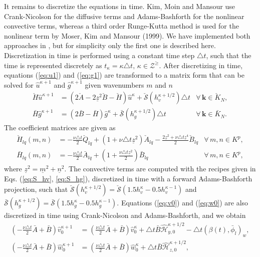 \documentclass[preprint]{elsarticle}
\newcommand{\N}[1]{\check{#1}}
\newcommand{\D}[1]{\bar{#1}}
\begin{document}
It remains to discretize the equations in time. Kim, Moin and Mansour use 
Crank-Nicolson for the diffusive terms and Adams-Bashforth for the nonlinear 
convective terms, whereas a third order Runge-Kutta method is used for the 
nonlinear term by Moser, Kim and Mansour (1999). We have implemented both 
approaches in \cite{spectralDNS}, but for simplicity only the first one is described here. 
Discretization in time is performed using a constant time step $\triangle t$, 
such that the time is represented discretely as $t_{\kappa} = {\kappa} \triangle t, \, {\kappa} \in 
\mathcal{Z}^{\ge}$. After 
discretizing in time, equations (\ref{eq:u1}) and (\ref{eq:g1}) are transformed 
to a matrix form that can be solved for $\hat{u}^{{\kappa}+1}$ and $\hat{g}^{{\kappa}+1}$ 
given wavenumbers $m$ and $n$
\begin{align}
\N{H}\hat{u}^{{\kappa}+1} & = \left(2\N{A} - 2\underline{z}^2\N{B} - \N{H} 
\right)\hat{u}^{{\kappa}} + \N{\mathcal{S}}(h_v^{{\kappa}+1/2}) \triangle t & 
\forall \, {\bm{k}} \in \N{K}_N, 
\label{eq:ufin}\\ 
\D{H} \hat{g}^{{\kappa}+1} &= \left(2 \D{B}-\D{H}\right) 
\hat{g}^{{\kappa}} + \D{\mathcal{S}}(h_g^{{\kappa}+1/2}) \triangle t &\forall \, 
{\bm{k}} \in 
\D{K}_N. \label{eq:gfin}
\end{align}
The coefficient matrices are given as
\begin{align}
\N{H}_{lq}(m, n) &= -\frac{\nu \triangle t}{2}\N{Q}_{lq} + \left( 1 + \nu 
\triangle t 
\underline{z}^2 \right) \N{A}_{lq} - \frac{2\underline{z}^2 + \nu \triangle t 
\underline{z}^4}{2} \N{B}_{lq} &\forall \, m, n \in K^p, 
\label{eq:Biharmonic_matrix} \\
\D{H}_{lq}(m, n) &= -\frac{\nu \triangle 
t}{2}\D{A}_{lq} + (1 + \frac{\nu \triangle t \underline{z}^2}{2}) \D{B}_{lq} 
&\forall \, m, n \in K^p, \label{eq:Helmholtz_matrix}
\end{align}
where $\underline{z}^2 = \underline{m}^2 + \underline{n}^2$. The convective 
terms are computed with the recipes given in Eqs. (\ref{eq:S_hv}, \ref{eq:S_hg}), discretized in time with a forward Adams-Bashforth projection, such that 
$\N{\mathcal{S}}(h_v^{{\kappa}+1/2}) = 
\N{\mathcal{S}}(1.5h_v^{{\kappa}} - 0.5 h_v^{{\kappa}-1})$ and $\D{\mathcal{S}}(h_g^{{\kappa}+1/2}) 
= \D{\mathcal{S}}(1.5h_g^{{\kappa}} - 0.5 h_g^{{\kappa}-1})$. Equations 
(\ref{eq:v0}) and (\ref{eq:w0}) are also discretized in time using 
Crank-Nicolson and Adams-Bashforth, and we obtain
\begin{align}
\left(-\frac{\nu \triangle t}{2}\D{A} + \D{B} \right)\hat{v}_0^{{\kappa}+1} &= 
\left(\frac{\nu \triangle t}{2}\D{A} + \D{B} 
\right)\hat{v}^{{\kappa}}_0 + \triangle t\D{B}\hat{\mathcal{H}}_{y,0}^{{\kappa}+1/2} - \triangle t \left(\beta(t), \D{\phi}_l \right)_w , 
\label{eq:v00} \\
\left(-\frac{\nu \triangle t}{2}\D{A} + \D{B} \right)\hat{w}_0^{{\kappa}+1} &= 
\left(\frac{\nu \triangle t}{2}\D{A} + \D{B} 
\right)\hat{w}^{{\kappa}}_0 + \triangle t\D{B}\hat{\mathcal{H}}_{z,0}^{{\kappa}+1/2}, 
\label{eq:w00}
\end{align}
\end{document}
